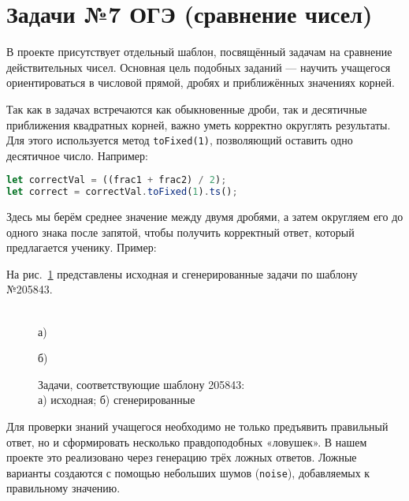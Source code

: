
\section{Задачи №7 ОГЭ (сравнение чисел)}
В проекте присутствует отдельный шаблон, посвящённый задачам на сравнение действительных чисел. 
Основная цель подобных заданий --- научить учащегося ориентироваться в числовой прямой, дробях и приближённых значениях корней.  

Так как в задачах встречаются как обыкновенные дроби, так и десятичные приближения квадратных корней, 
важно уметь корректно округлять результаты. Для этого используется метод \verb|toFixed(1)|, позволяющий оставить одно десятичное число. Например:

\begin{lstlisting}[language=JavaScript]
let correctVal = ((frac1 + frac2) / 2);
let correct = correctVal.toFixed(1).ts();
\end{lstlisting}
Здесь мы берём среднее значение между двумя дробями, а затем округляем его до одного знака после запятой, 
чтобы получить корректный ответ, который предлагается ученику.  
Пример:
 

На рис.~\ref{ris:205843} представлены исходная и сгенерированные задачи по шаблону №205843.

\begin{figure}[h]
\begin{minipage}[h]{0.7\linewidth}
 \\а)
\end{minipage}
\vfill
\begin{minipage}[h]{0.6\linewidth}
 б) \\
\end{minipage}
\caption{Задачи, соответствующие шаблону 205843:
\\
а) исходная; б) сгенерированные}
\label{ris:205843}
\end{figure}

Для проверки знаний учащегося необходимо не только предъявить правильный ответ, 
но и сформировать несколько правдоподобных «ловушек». 
В нашем проекте это реализовано через генерацию трёх ложных ответов. 
Ложные варианты создаются с помощью небольших шумов (\verb|noise|), добавляемых к правильному значению.  

